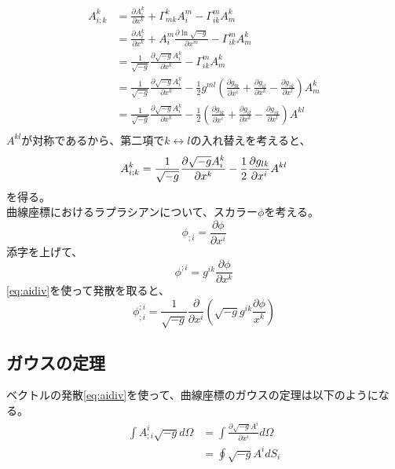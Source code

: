 \documentclass{jsarticle}
\newcommand{\pder}[2][]{\frac{\partial#1}{\partial#2}}
\begin{document}
\begin{align}
    A^k_{i;k} 
    &= 
    \pder[A^k_i]{x^k} + \Gamma^k_{mk}A^m_i - \Gamma^m_{ik}A^k_m\\
    &= 
    \pder[A^k_i]{x^k} + A^m_i\pder[\ln{\sqrt{-g}}]{x^m} - \Gamma^m_{ik}A^k_m\\
    &=
    \frac{1}{\sqrt{-g}}\frac{\partial \sqrt{-g}A^k_i}{\partial{x^{k}}}
    - \Gamma^m_{ik}A^k_m\\
    &=
    \frac{1}{\sqrt{-g}}\frac{\partial \sqrt{-g}A^k_i}{\partial{x^{k}}}
    - 
    \frac{1}{2}g^{ml} 
    \left(
    \frac{\partial{g_{lk}}}{\partial{x^{i}}}
     +
    \frac{\partial{g_{il}}}{\partial{x^{k}}}
     -
    \frac{\partial{g_{ik}}}{\partial{x^{l}}}
    \right)
    A^k_m\\
    &= 
    \frac{1}{\sqrt{-g}}\frac{\partial \sqrt{-g}A^k_i}{\partial{x^{k}}}
    - 
    \frac{1}{2} 
    \left(
    \frac{\partial{g_{lk}}}{\partial{x^{i}}}
     +
    \frac{\partial{g_{il}}}{\partial{x^{k}}}
     -
    \frac{\partial{g_{ik}}}{\partial{x^{l}}}
    \right)
    A^{kl}\\
\end{align}
$A^{kl}$が対称であるから、第二項で$k \leftrightarrow l$の入れ替えを考えると、
\begin{equation}
    A^k_{i;k} = 
    \frac{1}{\sqrt{-g}}\frac{\partial \sqrt{-g}A^k_i}{\partial{x^{k}}}
    - 
    \frac{1}{2} 
    \frac{\partial{g_{lk}}}{\partial{x^{i}}}
    A^{kl}\\
\end{equation}
を得る。\\
曲線座標におけるラプラシアンについて、スカラー$\phi$を考える。
\begin{equation}
\phi_{;i} = \pder[\phi]{x^i}
\end{equation}
添字を上げて、
\begin{equation}
    \phi^{;i} = g^{ik}\pder[\phi]{x^k}
\end{equation}
\eqref{eq:aidiv}を使って発散を取ると、
\begin{equation}
    \phi^{;i}_{;i} = 
    \frac{1}{\sqrt{-g}}
    \frac{\partial}{\partial{x^{i}}}
    \left(
        \sqrt{-g}g^{ik} \frac{\partial\phi}{x^{k}}
    \right)
\end{equation}
\subsection{ガウスの定理}
ベクトルの発散\eqref{eq:aidiv}を使って、曲線座標のガウスの定理は以下のようになる。
\begin{align}
    \int A^i_{;i} \sqrt{-g}d\Omega &= \int \pder[\sqrt{-g}A^i]{x^i}d\Omega\\
                                   &= \oint \sqrt{-g}A^idS_i
\end{align}
\end{document}
